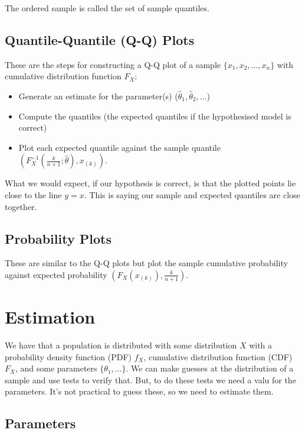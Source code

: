 \documentclass[a4paper, 12pt, twoside]{article}
\begin{document}
The ordered sample is called the set of sample quantiles.

\newpage

\subsection{Quantile-Quantile (Q-Q) Plots}

These are the steps for constructing a Q-Q plot of a sample
$\{x_1, x_2, \ldots, x_n\}$ with cumulative distribution function
$F_X$:

\begin{itemize}
    \item Generate an estimate for the parameter(s)
          ($\hat\theta_1, \hat\theta_2, \ldots$)
    \item Compute the quantiles (the expected quantiles if the
          hypothesised model is correct)
    \item Plot each expected quantile against the sample quantile
          $(F_X^{-1}(\frac{k}{n + 1}; \hat\theta), x_{(k)})$.
\end{itemize}

What we would expect, if our hypothesis is correct, is that the
plotted points lie close to the line $y = x$. This is saying our
sample and expected quantiles are close together.

\subsection{Probability Plots}

These are similar to the Q-Q plots but plot the sample cumulative
probability against expected probability $(F_X(x_{(k)}), \frac{k}{n + 1})$.


\section{Estimation}

We have that a population is distributed with some distribution $X$
with a probability density function (PDF) $f_X$, cumulative
distribution function (CDF) $F_X$, and some parameters
$\{\theta_1, \ldots\}$. We can make guesses at the distribution of a sample and use tests to
verify that. But, to do these tests we need a valu for the parameters.
It's not practical to guess these, so we need to estimate them.

\subsection{Parameters}
\end{document}
